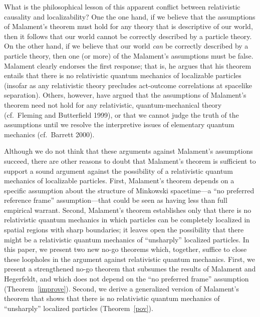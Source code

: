 \documentclass[11pt]{article}
\theoremstyle{remark}
\begin{document}
What is the philosophical lesson of this apparent conflict between
relativistic causality and localizability?  One the one hand, if we
believe that the assumptions of Malament's theorem must hold for any
theory that is descriptive of our world, then it follows that our
world cannot be correctly described by a particle theory.  On the
other hand, if we believe that our world \emph{can} be correctly
described by a particle theory, then one (or more) of the Malament's
assumptions must be false.  Malament clearly endorses the first
response; that is, he argues that his theorem entails that there is no
relativistic quantum mechanics of localizable particles (insofar as
any relativistic theory precludes act-outcome correlations at
spacelike separation).  Others, however, have argued that the
assumptions of Malament's theorem need not hold for any relativistic,
quantum-mechanical theory (cf.~Fleming and Butterfield 1999), or that
we cannot judge the truth of the assumptions until we resolve the
interpretive issues of elementary quantum mechanics (cf.~Barrett
2000).

Although we do not think that these arguments against Malament's
assumptions succeed, there are other reasons to doubt that Malament's
theorem is sufficient to support a sound argument against the
possibility of a relativistic quantum mechanics of localizable
particles.  First, Malament's theorem depends on a specific assumption
about the structure of Minkowski spacetime---a ``no preferred
reference frame'' assumption---that could be seen as having less than
full empirical warrant.  Second, Malament's theorem establishes only
that there is no relativistic quantum mechanics in which particles can
be completely localized in spatial regions with sharp boundaries; it
leaves open the possibility that there might be a relativistic quantum
mechanics of ``unsharply'' localized particles.  In this paper, we
present two new no-go theorems which, together, suffice to close these
loopholes in the argument against relativistic quantum mechanics.
First, we present a strengthened no-go theorem that subsumes the
results of Malament and Hegerfeldt, and which does not depend on the
``no preferred frame'' assumption (Theorem~\ref{improve}).  Second, we
derive a generalized version of Malament's theorem that shows that
there is no relativistic quantum mechanics of ``unsharply'' localized
particles (Theorem~\ref{pov}).
\end{document}

